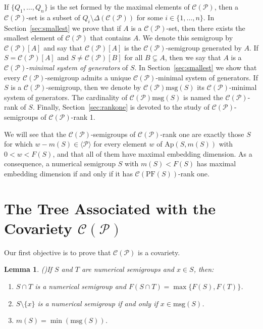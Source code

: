\documentclass[11pt]{article}
\newtheorem{lemma}[theorem]{Lemma}
\numberwithin{equation}{section}
\newcommand{\CP}{\mathcal C(\mathcal P)}
\newcommand{\Ap}{\mathrm{Ap}}
\newcommand{\PF}{\mathrm{PF}}
\begin{document}
If $\{Q_1,\dots,Q_n\}$ is the set formed by the maximal elements of $\mathcal C(\mathcal P)$, then a $\mathcal C(\mathcal P)$-set is a subset of $Q_i\setminus{\Delta(\mathcal C(\mathcal P))}$ for some $i\in\{1,\ldots,n\}$. In Section~\ref{sec:smallest} we prove that if $A$ is a $\mathcal C(\mathcal P)$-set, then there exists the smallest element of $\mathcal C(\mathcal P)$ that contains $A$. We denote this semigroup by $\mathcal C(\mathcal P)[A]$ and say that $\mathcal C(\mathcal P)[A]$ is the $\mathcal C(\mathcal P)$-semigroup generated by $A$. If $S=\mathcal C(\mathcal P)[A]$ and $S\ne\mathcal C(\mathcal P)[B]$ for all $B\subsetneq A$, then we say that $A$ is a $\mathcal C(\mathcal P)$-\textit{minimal system of generators} of $S$. In Section~\ref{sec:smallest} we show that every $\mathcal C(\mathcal P)$-semigroup admits a unique $\mathcal C(\mathcal P)$-minimal system of generators. If $S$ is a $\mathcal C(\mathcal P)$-semigroup, then we denote by $\mathcal C(\mathcal P)\mathrm{msg}(S)$ its $\mathcal C(\mathcal P)$-minimal system of generators. The cardinality of $\mathcal C(\mathcal P)\mathrm{msg}(S)$ is named the $\mathcal C(\mathcal P)$-rank of $S$. Finally, Section~\ref{sec:rankone} is devoted to the study of $\mathcal C(\mathcal P)$-semigroups of $\mathcal C(\mathcal P)$-rank 1.

We will see that the $\CP$-semigroups of $\CP$-rank one are exactly those $S$ for which $w-m(S)\in\langle\mathcal P\rangle$ for every element $w$ of $\Ap(S,m(S))$ with $0<w<F(S)$, and that all of them have maximal embedding dimension. As a consequence, a numerical semigroup $S$ with $m(S)<F(S)$ has maximal embedding dimension if and only if it has $\mathcal C(\PF(S))$-rank one.

\section{The Tree Associated with the Covariety \texorpdfstring{$\mathcal C(\mathcal P)$}{C(P)}}\label{sec:tree}

Our first objective is to prove that $\mathcal C(\mathcal P)$ is a covariety.

\begin{lemma}(\cite[Lemma 3.2]{covariedades})\label{lema primero}
    If $S$ and $T$ are numerical semigroups and $x\in S$, then:
    \begin{enumerate}
        \item $S\cap T$ is a numerical semigroup and $F(S\cap T)=\max\{F(S),F(T)\}$.
        \item $S\setminus\{x\}$ is a numerical semigroup if and only if $x\in\mathrm{msg}(S)$.
        \item $m(S)=\min(\mathrm{msg}(S))$.
    \end{enumerate}
\end{lemma}
\end{document}
